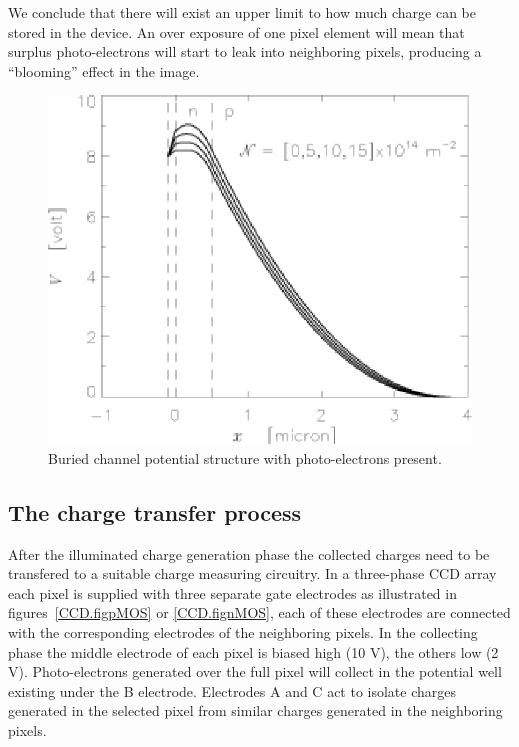 We conclude that there will exist an upper limit to how much charge
can be stored in the device. An over exposure of one pixel element
will mean that surplus photo-electrons will start to leak into
neighboring pixels, producing a ``blooming'' effect in the image.


\begin{figure}[h]
  \centering
	\includegraphics{CCD_burchanph.eps}
  \caption{Buried channel potential structure with photo-electrons present.}
  \label{CCD.figburchanph}
\end{figure}




\subsection{The charge transfer process} 

After the illuminated charge generation phase the collected charges
need to be transfered to a suitable charge measuring circuitry. In a
three-phase CCD array each pixel is supplied with three separate gate
electrodes as illustrated in figures~\ref{CCD.figpMOS} or
\ref{CCD.fignMOS}, each of these electrodes are connected with the
corresponding electrodes of the neighboring pixels.  In the
collecting phase the middle electrode of each pixel is biased high (10
V), the others low (2 V). Photo-electrons generated over the full pixel
will collect in the potential well existing under the B electrode.
Electrodes A and C act to isolate charges generated in the selected
pixel from similar charges generated in the neighboring pixels.

